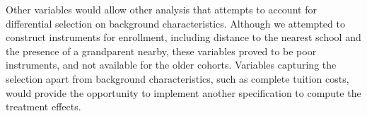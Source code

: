 Other variables would allow other analysis that attempts to account for differential selection on background characteristics. Although we attempted to construct instruments for enrollment, including distance to the nearest school and the presence of a grandparent nearby, these variables proved to be poor instruments, and not available for the older cohorts. Variables capturing the selection apart from background characteristics, such as complete tuition costs, would provide the opportunity to implement another specification to compute the treatment effects.



